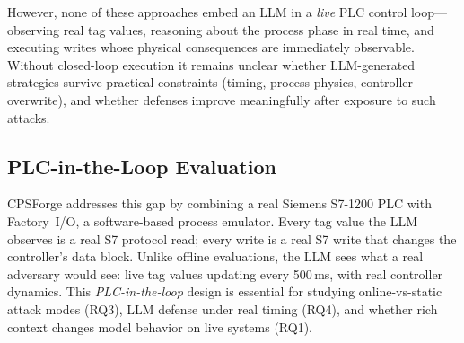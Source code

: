 However, none of these approaches embed an LLM in a \emph{live} PLC control loop---observing real tag values, reasoning about the process phase in real time, and executing writes whose physical consequences are immediately observable. Without closed-loop execution it remains unclear whether LLM-generated strategies survive practical constraints (timing, process physics, controller overwrite), and whether defenses improve meaningfully after exposure to such attacks.

\subsection{PLC-in-the-Loop Evaluation}

CPSForge addresses this gap by combining a real Siemens S7-1200 PLC with Factory~I/O, a software-based process emulator. Every tag value the LLM observes is a real S7 protocol read; every write is a real S7 write that changes the controller's data block. Unlike offline evaluations, the LLM sees what a real adversary would see: live tag values updating every 500\,ms, with real controller dynamics. This \emph{PLC-in-the-loop} design is essential for studying online-vs-static attack modes (RQ3), LLM defense under real timing (RQ4), and whether rich context changes model behavior on live systems (RQ1).